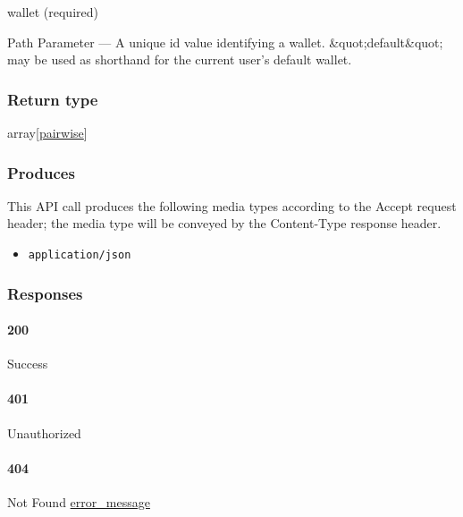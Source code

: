 wallet (required)

{Path Parameter} --- A unique id value identifying a wallet.
\&quot;default\&quot; may be used as shorthand for the current user's
default wallet.

\hypertarget{return-type-69}{%
\subsubsection{Return type}\label{return-type-69}}

array{[}\protect\hyperlink{pairwise}{pairwise}{]}

\hypertarget{produces-84}{%
\subsubsection{Produces}\label{produces-84}}

This API call produces the following media types according to the
{Accept} request header; the media type will be conveyed by the
{Content-Type} response header.

\begin{itemize}
\tightlist
\item
  \texttt{application/json}
\end{itemize}

\hypertarget{responses-86}{%
\subsubsection{Responses}\label{responses-86}}

\hypertarget{section-281}{%
\paragraph{200}\label{section-281}}

Success

\hypertarget{section-282}{%
\paragraph{401}\label{section-282}}

Unauthorized \protect\hyperlink{}{}

\hypertarget{section-283}{%
\paragraph{404}\label{section-283}}

Not Found \protect\hyperlink{error_message}{error\_message}


